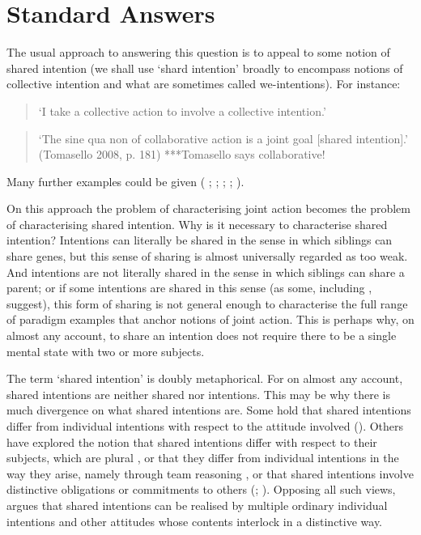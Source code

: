 \documentclass[12pt,a4paper]{extarticle}
\begin{document}
\section{Standard Answers}
The usual approach to answering this question is to appeal to some notion of shared intention (we shall use `shard intention' broadly to encompass notions of collective intention and what are sometimes called we-intentions).
For instance:  
%
\begin{quote} 
`I take a collective action to involve a collective intention.'  \citep[p.\ 5]{Gilbert:2006wr}
\end{quote}
%
\begin{quote} 
`The sine qua non of collaborative action is a joint goal [shared intention].’ 
(Tomasello 2008, p. 181)
***Tomasello says collaborative!
\end{quote} 
%
Many further examples could be given  (%
	\citealp[p.\ 381]{Carpenter:2009wq}; 
	\citealp[p.\ 369]{Call:2009fk};
	\citealp{Kutz:2000si}; 
	\citealp[p.\ 117]{rakoczy_pretend_2006}; 
	\citealp{Tollefsen:2005vh}%
	).

On this approach the problem of characterising joint action becomes the problem of characterising shared intention.
Why is it necessary to characterise shared intention?
Intentions can literally be shared in the sense in which siblings can share genes, but this sense of sharing is almost universally regarded as too weak.
And intentions are not literally shared in the sense in which siblings can share a parent; or if some intentions are shared in this sense (as some, including \citealp{Velleman:1997oo}, suggest), this form of sharing is not general enough to characterise the full range of paradigm examples that anchor notions of joint action.
This is perhaps why, on almost any account, to share an intention does not require there to be a single mental state with two or more subjects.

The term `shared intention' is doubly metaphorical.
For on almost any account, shared intentions are neither shared nor intentions.
This may be why there is {much divergence on what shared intentions are}. 
Some hold that shared intentions differ from individual intentions with respect to the attitude involved (\citealp{Searle:1990em}). 
Others have explored the notion that shared intentions differ with respect to their subjects, which are plural \citep{Gilbert:1992rs,helm_plural_2008}, 
or that they differ from individual intentions in the way they arise, namely through team reasoning \citep{Gold:2007zd}, 
or that shared intentions involve distinctive obligations or commitments to others (\citealp{Gilbert:1992rs}; \citealp{Roth:2004ki}).
Opposing all such views, \citet{Bratman:1992mi,Bratman:2009lv} argues that shared intentions can be realised by multiple ordinary individual intentions and other attitudes whose contents interlock in a distinctive way. 
\end{document}
